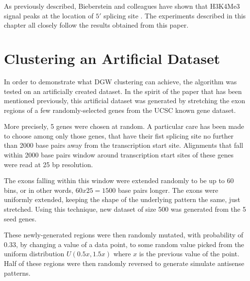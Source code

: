 \documentclass[parskip]{cs4rep}
\newcommand{\histonemodification}[1]{#1}
\begin{document}
As previously described, Bieberstein and colleagues have shown that \histonemodification{H3K4Me3} signal peaks at the location of $5'$ splicing site \cite{Bieberstein:2012tf}. The experiments described in this chapter all closely follow the results obtained from this paper.

\section{Clustering an Artificial Dataset}

In order to demonstrate what DGW clustering can achieve, the algorithm was tested on an artificially created dataset. In the spirit of the paper that has been mentioned previously, this artificial dataset was generated by  stretching the exon regions of a few randomly-selected genes from the UCSC known gene dataset.

More precisely, 5 genes were chosen at random. A particular care has been made to choose among only those genes, that have their fist splicing site no further than 2000 base pairs away from the transcription start site.  Alignments that fall within 2000 base pairs window around transcription start sites of these genes were read at 25 bp resolution.

The exons falling within this window were extended randomly to be up to 60 bins, or in other words, $60x25=1500$ base pairs longer. The exons were uniformly extended, keeping the shape of the underlying pattern the same, just stretched. Using this technique, new dataset of size 500 was generated from the 5 seed genes.

These newly-generated regions were then randomly mutated, with probability of $0.33$, by changing a value of a data point, to some random value picked from the uniform distribution $U(0.5x, 1.5x)$ where $x$ is the previous value of the point. Half of these regions were then randomly reversed to generate simulate antisense patterns.
\end{document}
